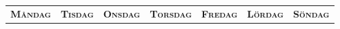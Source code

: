\pagestyle{empty}
\begin{center}
  
\end{center}
\newpage
\begin{center}
  
\end{center}
\begin{tabularx}{\textwidth}{@{}RRRRRRS}
  \textbf{\textsc{Måndag}}&\textbf{\textsc{Tisdag}}&\textbf{\textsc{Onsdag}}&\textbf{\textsc{Torsdag}}&\textbf{\textsc{Fredag}}&\textbf{\textsc{Lördag}}&\textbf{\textsc{Söndag}}\\
\end{tabularx}
\\
\begin{tabularx}{\textwidth}{|D|D|D|D|D|D|Z|}
  \hline
  
\end{tabularx}
